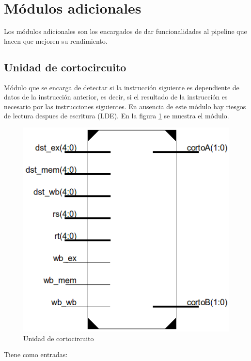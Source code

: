 \section{M\'odulos adicionales}
Los m\'odulos adicionales son los encargados de dar funcionalidades al pipeline que hacen que mejoren su rendimiento.
\subsection{Unidad de cortocircuito}
M\'odulo que se encarga de detectar si la instrucci\'on siguiente es dependiente de datos de la instrucci\'on anterior, es decir, si el resultado de la instrucci\'on es necesario por las instrucciones siguientes. En ausencia de este m\'odulo hay riesgos de lectura despues de escritura (LDE). En la figura \ref{fig:fwd} se muestra el m\'odulo.

\begin{figure}[H]
\centering
\includegraphics[scale=0.5]{img/forwarding}
\caption{Unidad de cortocircuito}
\label{fig:fwd}
\end{figure}

Tiene como entradas:

